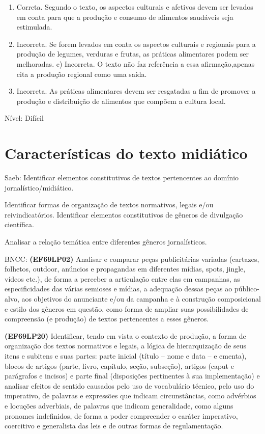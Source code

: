 {\begin{enumerate}
\def\labelenumi{\arabic{enumi}.}
\item
  Correta. Segundo o texto, os aspectos culturais e afetivos devem ser
  levados em conta para que a produção e consumo de alimentos saudáveis
  seja estimulada.
\item
  Incorreta. Se forem levados em conta os aspectos culturais e regionais
  para a produção de legumes, verduras e frutas, as práticas alimentares
  podem ser melhoradas. c) Incorreta. O texto não faz referência a essa
  afirmação,apenas cita a produção regional como uma saída.
\item
  Incorreta. As práticas alimentares devem ser resgatadas a fim de
  promover a produção e distribuição de alimentos que compõem a cultura
  local.
\end{enumerate}

Nível: Difícil

\pagestyle{port}
\chapter{Características do texto midiático}

Saeb: Identificar elementos constitutivos de textos pertencentes ao
domínio jornalístico/midiático.

Identificar formas de organização de textos normativos, legais e/ou
reivindicatórios. Identificar elementos constitutivos de gêneros de
divulgação científica.

Analisar a relação temática entre diferentes gêneros jornalísticos.

BNCC: \textbf{(EF69LP02)} Analisar e comparar peças publicitárias
variadas (cartazes, folhetos, outdoor, anúncios e propagandas em
diferentes mídias, spots, jingle, vídeos etc.), de forma a perceber a
articulação entre elas em campanhas, as especificidades das várias
semioses e mídias, a adequação dessas peças ao público-alvo, aos
objetivos do anunciante e/ou da campanha e à construção composicional e
estilo dos gêneros em questão, como forma de ampliar suas possibilidades
de compreensão (e produção) de textos pertencentes a esses gêneros.

\textbf{(EF69LP20)} Identificar, tendo em vista o contexto de produção,
a forma de organização dos textos normativos e legais, a lógica de
hierarquização de seus itens e subitens e suas partes: parte inicial
(título -- nome e data -- e ementa), blocos de artigos (parte, livro,
capítulo, seção, subseção), artigos (caput e parágrafos e incisos) e
parte final (disposições pertinentes à sua implementação) e analisar
efeitos de sentido causados pelo uso de vocabulário técnico, pelo uso do
imperativo, de palavras e expressões que indicam circunstâncias, como
advérbios e locuções adverbiais, de palavras que indicam generalidade,
como alguns pronomes indefinidos, de forma a poder compreender o caráter
imperativo, coercitivo e generalista das leis e de outras formas de
regulamentação.

}
